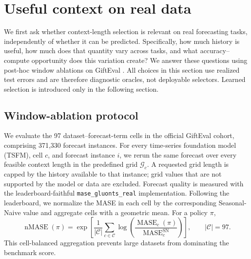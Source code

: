 
\section{Useful context on real data}
\label{sec:real-context}

We first ask whether context-length selection is relevant on real forecasting
tasks, independently of whether it can be predicted.  Specifically, how much
history is useful, how much does that quantity vary across tasks, and what
accuracy--compute opportunity does this variation create?  We answer these
questions using post-hoc window ablations on GiftEval
\cite{aksu2024gifteval}.  All choices in this section use realized test errors
and are therefore diagnostic oracles, not deployable selectors.  Learned
selection is introduced only in the following section.

\subsection{Window-ablation protocol}
\label{sec:real-protocol}

We evaluate the 97 dataset--forecast-term cells in the official GiftEval
cohort, comprising 371{,}330 forecast instances.  For every time-series
foundation model (TSFM), cell $c$, and forecast instance $i$, we rerun the same
forecast over every feasible context length in the predefined grid
$\mathcal{G}_c$.  A requested grid length is capped by the history available to
that instance; grid values that are not supported by the model or data are
excluded.  Forecast quality is measured with the leaderboard-faithful
\texttt{mase\_gluonts\_real} implementation.  Following the leaderboard, we
normalize the MASE in each cell by the corresponding Seasonal-Naive value and
aggregate cells with a geometric mean.  For a policy $\pi$,
\begin{equation}
    \operatorname{nMASE}(\pi)
    = \exp\!\left[
        \frac{1}{|\mathcal{C}|}
        \sum_{c\in\mathcal{C}}
        \log\!\left(
            \frac{\operatorname{MASE}_c(\pi)}
                 {\operatorname{MASE}^{\mathrm{SN}}_c}
        \right)
      \right],
    \qquad |\mathcal{C}|=97.
    \label{eq:normalized-mase}
\end{equation}
This cell-balanced aggregation prevents large datasets from dominating the
benchmark score.

